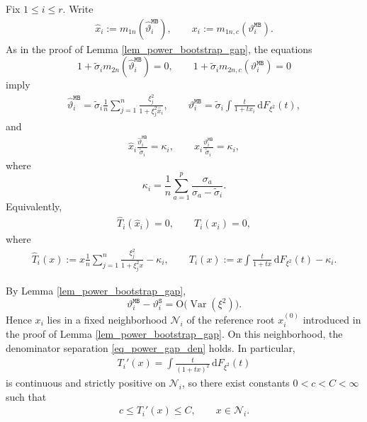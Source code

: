 \documentclass[12pt]{article}
\theoremstyle{plain}
\numberwithin{equation}{section}
\begin{document}
Fix $1\le i\le r$. Write
\begin{align*}
	\widehat{x}_i:=m_{1n}(\widehat{\vartheta}_i^{\mathtt{MB}}),
	\qquad
	x_i:=m_{1n,c}(\vartheta_i^{\mathtt{MB}}).
\end{align*}
As in the proof of Lemma \ref{lem_power_bootstrap_gap}, the equations
\[
1+\widetilde{\sigma}_im_{2n}(\widehat{\vartheta}^{\mathtt{MB}}_i)=0,
\qquad
1+\widetilde{\sigma}_im_{2n,c}(\vartheta^{\mathtt{MB}}_i)=0
\]
imply
\begin{align*}
	\widehat{\vartheta}^{\mathtt{MB}}_i
	=
	\widetilde{\sigma}_i\frac{1}{n}\sum_{j=1}^n\frac{\xi_j^2}{1+\xi_j^2\widehat{x}_i},
	\qquad
	\vartheta^{\mathtt{MB}}_i
	=
	\widetilde{\sigma}_i\int\frac{t}{1+t x_i}\,\mathrm{d}F_{\xi^2}(t),
\end{align*}
and
\begin{align*}
	\widehat{x}_i\frac{\widehat{\vartheta}^{\mathtt{MB}}_i}{\widetilde{\sigma}_i}
	=
	\kappa_i,
	\qquad
	x_i\frac{\vartheta^{\mathtt{MB}}_i}{\widetilde{\sigma}_i}
	=
	\kappa_i,
\end{align*}
where
\[
\kappa_i=\frac{1}{n}\sum_{a=1}^p\frac{\sigma_a}{\sigma_a-\widetilde{\sigma}_i}.
\]
Equivalently,
\begin{align}\label{eq_power_loc_root}
	\widehat{T}_i(\widehat{x}_i)=0,
	\qquad
	T_i(x_i)=0,
\end{align}
where
\begin{align*}
	\widehat{T}_i(x):=
	x\frac{1}{n}\sum_{j=1}^n\frac{\xi_j^2}{1+\xi_j^2x}-\kappa_i,
	\qquad
	T_i(x):=
	x\int\frac{t}{1+t x}\,\mathrm{d}F_{\xi^2}(t)-\kappa_i.
\end{align*}

By Lemma \ref{lem_power_bootstrap_gap},
\[
\vartheta_i^{\mathtt{MB}}-\vartheta_i^{\mathtt{S}}
=
\mathrm{O}\big(\operatorname{Var}(\xi^2)\big).
\]
Hence $x_i$ lies in a fixed neighborhood $\mathcal N_i$ of the reference root $x_i^{(0)}$ introduced in the proof of Lemma \ref{lem_power_bootstrap_gap}. On this neighborhood, the denominator separation \eqref{eq_power_gap_den} holds. In particular,
\begin{align*}
	T_i'(x)
	=
	\int\frac{t}{(1+t x)^2}\,\mathrm{d}F_{\xi^2}(t)
\end{align*}
is continuous and strictly positive on $\mathcal N_i$, so there exist constants $0<c<C<\infty$ such that
\begin{align}\label{eq_power_loc_derivative_det}
	c\le T_i'(x)\le C,\qquad x\in\mathcal N_i.
\end{align}
\end{document}
